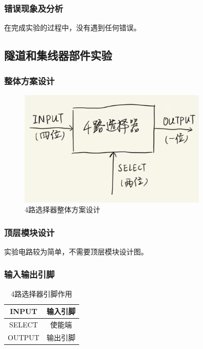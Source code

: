 \documentclass{article}
\begin{document}
    \subsubsection{错误现象及分析}
    在完成实验的过程中，没有遇到任何错误。


    \subsection{隧道和集线器部件实验}

    \subsubsection{整体方案设计}
    \begin{figure}[H]
    \centering
    \includegraphics[width=0.8\textwidth]{7.1.png}
    \caption{4路选择器整体方案设计}
    \end{figure}
    
    \subsubsection{顶层模块设计}
    实验电路较为简单，不需要顶层模块设计图。

    \subsubsection{输入输出引脚}
    \begin{table}[H]
    \centering
    \begin{tabular}{|c|c|}
        \hline
        INPUT & 输入引脚 \\ \hline
        SELECT & 使能端 \\ \hline 
        OUTPUT & 输出引脚 \\ \hline
    \end{tabular}
    \caption{4路选择器引脚作用}
    \end{table}
\end{document}
